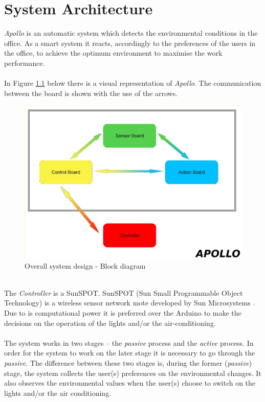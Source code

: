 \documentclass[12pt,a4paper]{report}
\begin{document}
\chapter{System Architecture}
%
\emph{Apollo} is an automatic system which detects the environmental conditions in the office. As a smart system it reacts, accordingly to the preferences of the users in the office, to achieve the optimum environment to maximise the work performance.\\
\ \\
In Figure \ref{arch_design} below there is a visual representation of \emph{Apollo}. The communication between the board is shown with the use of the arrows.\\
%
\begin{figure}[H]
\centering
\includegraphics*[scale=0.35]{architecture_design}
\caption{Overall system design - Block diagram}
\label{arch_design}
\end{figure}
\ \\
The \textit{Controller} is a SunSPOT. SunSPOT (Sun Small Programmable Object Technology) is a wireless sensor network mote developed by Sun Microsystems \cite{website:sunspot}. Due to is computational power it is preferred over the Arduino to make the decisions on the operation of the lights and/or the air-conditioning. \\ 
\ \\
The system works in two stages -- the \emph{passive} process and the \emph{active} process. In order for the system to work on the later stage it is necessary to go through the \emph{passive}. The difference between these two stages is, during the former (\emph{passive}) stage, the system collects the user(s) preferences on the environmental changes. It also observes the environmental values when the user(s) choose to switch on the lights and/or the air conditioning.\\
\end{document}
